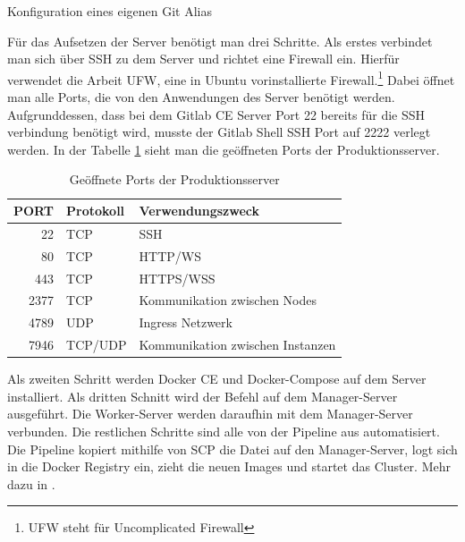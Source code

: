 \begin{listing}
    \inputminted{sh}{snippets/sh/pushall.sh}
    \caption{Konfiguration eines eigenen Git Alias}
    \label{lst:gitalias}
\end{listing}

Für das Aufsetzen der Server benötigt man drei Schritte.
Als erstes verbindet man sich über SSH zu dem Server und richtet eine Firewall ein.
Hierfür verwendet die Arbeit UFW, eine in Ubuntu vorinstallierte
Firewall.\footnote{UFW steht für Uncomplicated Firewall} Dabei öffnet man alle Ports,
die von den Anwendungen des Server benötigt werden. Aufgrunddessen, dass bei dem Gitlab CE Server
Port 22 bereits für die SSH verbindung benötigt wird, musste der Gitlab Shell SSH
Port auf 2222 verlegt werden. In der Tabelle \ref{tab:geoeffneteportsderproduktionsserver}
sieht man die geöffneten Ports der Produktionsserver.

\begin{table}[h]
\begin{center}
\begin{tabular}{rll}
PORT & Protokoll & Verwendungszweck\\
\hline
22 & TCP & SSH\\
80 & TCP & HTTP/WS\\
443 & TCP & HTTPS/WSS\\
2377 & TCP & Kommunikation zwischen Nodes\\
4789 & UDP & Ingress Netzwerk\\
7946 & TCP/UDP & Kommunikation zwischen Instanzen\\
\end{tabular}
\end{center}
\caption{Geöffnete Ports der Produktionsserver}
\label{tab:geoeffneteportsderproduktionsserver}
\end{table}

Als zweiten Schritt werden Docker CE und Docker-Compose auf dem Server installiert.
Als dritten Schnitt wird der Befehl  auf dem Manager-Server
ausgeführt. Die Worker-Server werden daraufhin mit dem Manager-Server verbunden.
Die restlichen Schritte sind alle von der Pipeline aus automatisiert. Die Pipeline
kopiert mithilfe von SCP die  Datei auf den Manager-Server,
logt sich in die Docker Registry ein, zieht die neuen Images und startet das Cluster.
Mehr dazu in .

